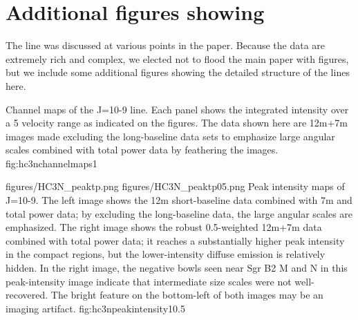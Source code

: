 \documentclass[twocolumn]{aastex61}
\begin{document}
\section{Additional figures showing \cyanoacetylene}
The \cyanoacetylene line was discussed at various points in the paper.  Because
the data are extremely rich and complex, we elected not to flood the main paper
with figures, but we include some additional figures showing the detailed
structure of the lines here.

{Channel maps of the \cyanoacetylene J=10-9 line.  Each panel shows the integrated
intensity over a 5 \kms velocity range as indicated on the figures.
The data shown here are 
12m+7m images made excluding the long-baseline data sets to emphasize
large angular scales
combined with total power
data by feathering the images.}
{fig:hc3nchannelmaps}{1}{\textwidth}

\FigureTwo
{figures/HC3N_peaktp.png}
{figures/HC3N_peaktp05.png}
{Peak intensity maps of \cyanoacetylene J=10-9.
The left image shows the 12m short-baseline data combined with 7m and total
power data; by excluding the long-baseline data, the large angular scales are
emphasized.  The right image shows the robust 0.5-weighted 12m+7m data combined
with total power data;
it reaches a substantially higher peak intensity in the compact regions, but
the lower-intensity diffuse emission is relatively hidden.  In the right image,
the negative bowls seen near Sgr B2 M and N in this peak-intensity image
indicate that intermediate size scales were not well-recovered.  The bright
feature on the bottom-left of both images may be an imaging artifact.}
{fig:hc3npeakintensity}{1}{0.5\textwidth}
\end{document}
